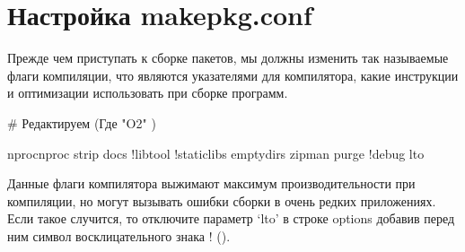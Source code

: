 \documentclass[letterpaper,10pt,russian,openany]{sphinxmanual}
\begin{document}
\ignorespaces 

\section{Настройка makepkg.conf}
\label{\detokenize{source/generic-system-acceleration:makepkg-conf}}\label{\detokenize{source/generic-system-acceleration:index-0}}\label{\detokenize{source/generic-system-acceleration:id2}}
\sphinxAtStartPar
Прежде чем приступать к сборке пакетов, мы должны изменить так называемые флаги компиляции,
что являются указателями для компилятора, какие инструкции и оптимизации использовать при сборке программ.

\sphinxAtStartPar
{} \# Редактируем (Где "\sphinxhyphen{}O2" \sphinxhyphen{} )

\sphinxAtStartPar
{}

\begin{sphinxVerbatim}[commandchars=\\\{\}]
nprocnproc
strip docs !libtool !staticlibs emptydirs zipman purge !debug lto
\end{sphinxVerbatim}

\sphinxAtStartPar
Данные флаги компилятора выжимают максимум производительности при компиляции, но могут вызывать ошибки сборки в очень редких приложениях.
Если такое случится, то отключите параметр ‘lto’ в строке options добавив перед ним символ восклицательного знака  ! ().
\end{document}
